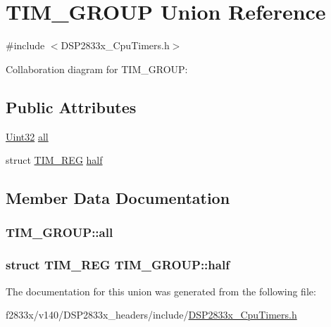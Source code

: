 \hypertarget{union_t_i_m___g_r_o_u_p}{}\section{T\+I\+M\+\_\+\+G\+R\+O\+U\+P Union Reference}
\label{union_t_i_m___g_r_o_u_p}


{\ttfamily \#include $<$D\+S\+P2833x\+\_\+\+Cpu\+Timers.\+h$>$}



Collaboration diagram for T\+I\+M\+\_\+\+G\+R\+O\+U\+P\+:
\subsection*{Public Attributes}
\begin{DoxyCompactItemize}
\item 
\hyperlink{_d_s_p2833x___device_8h_aba99025e657f892beb7ff31cecf64653}{Uint32} \hyperlink{union_t_i_m___g_r_o_u_p_ad3d6ae4950300ff038f70e325131ae13}{all}
\item 
struct \hyperlink{struct_t_i_m___r_e_g}{T\+I\+M\+\_\+\+R\+E\+G} \hyperlink{union_t_i_m___g_r_o_u_p_a17a1df257fcd7dae32999d489bd6da14}{half}
\end{DoxyCompactItemize}


\subsection{Member Data Documentation}
\hypertarget{union_t_i_m___g_r_o_u_p_ad3d6ae4950300ff038f70e325131ae13}{}
\subsubsection[{all}]{ T\+I\+M\+\_\+\+G\+R\+O\+U\+P\+::all}\label{union_t_i_m___g_r_o_u_p_ad3d6ae4950300ff038f70e325131ae13}
\hypertarget{union_t_i_m___g_r_o_u_p_a17a1df257fcd7dae32999d489bd6da14}{}
\subsubsection[{half}]{\setlength{\rightskip}{0pt plus 5cm}struct {\bf T\+I\+M\+\_\+\+R\+E\+G} T\+I\+M\+\_\+\+G\+R\+O\+U\+P\+::half}\label{union_t_i_m___g_r_o_u_p_a17a1df257fcd7dae32999d489bd6da14}


The documentation for this union was generated from the following file\+:\begin{DoxyCompactItemize}
\item 
f2833x/v140/\+D\+S\+P2833x\+\_\+headers/include/\hyperlink{_d_s_p2833x___cpu_timers_8h}{D\+S\+P2833x\+\_\+\+Cpu\+Timers.\+h}\end{DoxyCompactItemize}
